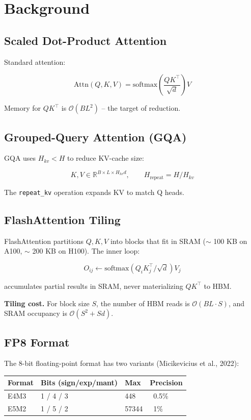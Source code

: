 
\section{Background}

\subsection{Scaled Dot-Product Attention}

Standard attention:

\[
\text{Attn}(Q, K, V) = \text{softmax}\!\left(\frac{Q K^\top}{\sqrt{d}}\right) V
\tag{3.1}
\]

Memory for $QK^\top$ is $\mathcal{O}(BL^2)$ -- the target of reduction.

\subsection{Grouped-Query Attention (GQA)}

GQA uses $H_{kv} < H$ to reduce KV-cache size:

\[
K, V \in \mathbb{R}^{B \times L \times H_{kv} d}, \qquad
H_{\text{repeat}} = H / H_{kv}
\tag{3.2}
\]

The \texttt{repeat\_kv} operation expands KV to match Q heads.

\subsection{FlashAttention Tiling}

FlashAttention partitions $Q, K, V$ into blocks that fit in SRAM ($\sim$ 100 KB 
on A100, $\sim$ 200 KB on H100). The inner loop:

\[
O_{ij} \leftarrow \text{softmax}(Q_i K_j^\top / \sqrt{d}) V_j
\tag{3.3}
\]

accumulates partial results in SRAM, never materializing $QK^\top$ to HBM.

\textbf{Tiling cost.} For block size $S$, the number of HBM reads is 
$\mathcal{O}(BL \cdot S)$, and SRAM occupancy is $\mathcal{O}(S^2 + Sd)$.

\subsection{FP8 Format}

The 8-bit floating-point format has two variants (Micikevicius et al., 2022):

\begin{table}[H]
\centering
\small
\begin{tabular}{llll}
\toprule
\textbf{Format} & \textbf{Bits (sign/exp/mant)} & \textbf{Max} & \textbf{Precision} \\
\midrule
E4M3 & 1 / 4 / 3 & 448 & ~0.5\% \\
E5M2 & 1 / 5 / 2 & 57344 & ~1\% \\
\bottomrule
\end{tabular}
\end{table}

